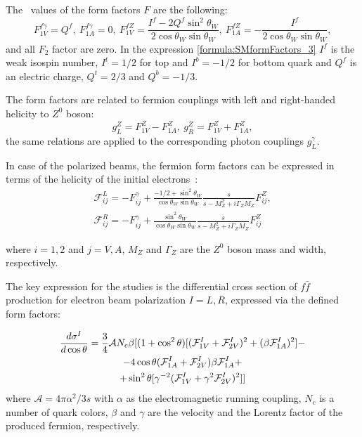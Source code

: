 The \sm\ values of the form factors $F$ are the following:
\begin{equation}
F^{f\gamma}_{1V} = Q^{f}, \ F^{f\gamma}_{1A} = 0, \ F^{fZ}_{1V} = \frac{I^f - 2Q^f\sin^2\theta_W}{2\cos\theta_W\sin\theta_W}, \ F^{fZ}_{1A} = - \frac{I^f}{2\cos\theta_W\sin\theta_W},
\label{formula:SMformFactors_3}
\end{equation}
and all $F_2$ factor are zero. In the expression \ref{formula:SMformFactors_3} $I^f$ is the weak isospin number, $I^t = 1/2$ for top and $I^b = -1/2$ for bottom quark and $Q^f$ is an electric charge, $Q^t = 2/3$ and $Q^b = -1/3$.

The form factors are related to fermion couplings with left and right-handed helicity to $Z^0$ boson:
\begin{equation}
g_L^Z = F_{1V}^Z - F_{1A}^Z, \  g_R^Z = F_{1V}^Z + F_{1A}^Z, 
\label{formula:EWcouplings_3}
\end{equation}
the same relations are applied to the corresponding photon couplings $g^\gamma_L$.

In case of the polarized beams, the fermion form factors can be expressed in terms of the helicity of the initial electrons~\cite{bib:Schmidt}:
\begin{eqnarray}
\mathcal{F}^L_{ij} = - F^\gamma_{ij} +  \frac{-1/2 + \sin^2\theta_W}{\cos\theta_W\sin\theta_W}\frac{s}{s-M^2_Z+i\Gamma_ZM_Z}F^Z_{ij},\\
\mathcal{F}^R_{ij} = - F^\gamma_{ij} +  \frac{\sin^2\theta_W}{\cos\theta_W\sin\theta_W}\frac{s}{s-M^2_Z+i\Gamma_ZM_Z}F^Z_{ij}    
\end{eqnarray}

where $i=1,2$ and $j=V,A$, $M_Z$ and $\Gamma_Z$ are the $Z^0$ boson mass and width, respectively.

The key expression for the studies is the differential cross section of $f\bar{f}$ production for electron beam polarization $I=L,R$, expressed via the defined form factors:

\begin{multline}
\label{formula:DiffSigma_3}
\frac{d\sigma^I}{d\cos\theta} = \frac{3}{4} \mathcal{A} N_c \beta[ (1+\cos^2\theta) [(\mathcal{F}^I_{1V}+\mathcal{F}^I_{2V})^2+(\beta \mathcal{F}^I_{1A})^2] - \\-4 \cos\theta (\mathcal{F}^I_{1A}+\mathcal{F}^I_{2V})\beta \mathcal{F}^I_{1A} +\\+ \sin^2\theta [\gamma ^{-2} (\mathcal{F}^I_{1V} +\gamma^2 \mathcal{F}^I_{2V})^2] ]
\end{multline}
where $\mathcal{A} = 4\pi\alpha^2/3s$ with $\alpha$ as the electromagnetic running coupling, $N_c$ is a number of quark colors, $\beta$ and $\gamma$ are the velocity and the Lorentz factor of the produced fermion, respectively. 

